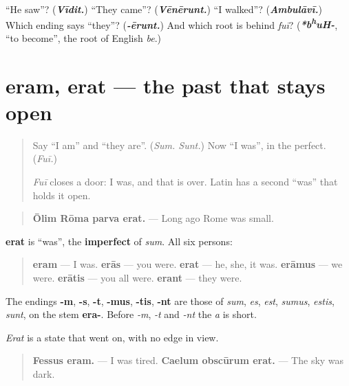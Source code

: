 \begin{tcolorbox}[breakable,colback=teal!4,colframe=teal!35!black,title={Before you move on}]
\textquotedblleft{}He saw\textquotedblright{}? (\emph{\textbf{Vīdit.}}) \textquotedblleft{}They came\textquotedblright{}? (\emph{\textbf{Vēnērunt.}}) \textquotedblleft{}I walked\textquotedblright{}? (\emph{\textbf{Ambulāvī.}}) Which ending says \textquotedblleft{}they\textquotedblright{}? (\emph{\textbf{-ērunt.}}) And which root is behind \emph{fuī}? (\emph{\textbf{*b\textsuperscript{h}uH-}}, \textquotedblleft{}to become\textquotedblright{}, the root of English \emph{be}.)
\end{tcolorbox}
\section[eram, erat, erant]{eram, erat — the past that stays open}

\label{lesson:LA-C281-eram}



\begin{quote}
Say \textquotedblleft{}I am\textquotedblright{} and \textquotedblleft{}they are\textquotedblright{}. (\emph{Sum. Sunt.}) Now \textquotedblleft{}I was\textquotedblright{}, in the perfect. (\emph{Fuī.})

\emph{Fuī} closes a door: I was, and that is over. Latin has a second \textquotedblleft{}was\textquotedblright{} that holds it open.
\end{quote}

\begin{grammarlens}[title={Grammar Lens: six forms, and the endings you know}]
\begin{quote}
\textbf{Ōlim Rōma parva erat.} — Long ago Rome was small.
\end{quote}

\textbf{erat} is \textquotedblleft{}was\textquotedblright{}, the \textbf{imperfect} of \emph{sum}. All six persons:

\begin{quote}
\textbf{eram} — I was. \textbf{erās} — you were. \textbf{erat} — he, she, it was. \textbf{erāmus} — we were. \textbf{erātis} — you all were. \textbf{erant} — they were.
\end{quote}

The endings \textbf{-m}, \textbf{-s}, \textbf{-t}, \textbf{-mus}, \textbf{-tis}, \textbf{-nt} are those of \emph{sum}, \emph{es}, \emph{est}, \emph{sumus}, \emph{estis}, \emph{sunt}, on the stem \textbf{era-}. Before \emph{-m}, \emph{-t} and \emph{-nt} the \emph{a} is short.

\emph{Erat} is a state that went on, with no edge in view.

\begin{quote}
\textbf{Fessus eram.} — I was tired. \textbf{Caelum obscūrum erat.} — The sky was dark.
\end{quote}
\end{grammarlens}

